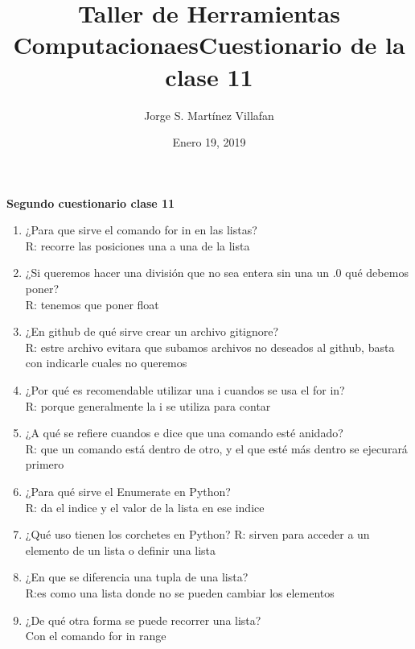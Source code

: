 \documentclass[letterpaper, 12pt, oneside]{article}%
\title{\Huge Taller de Herramientas Computacionaes}
\author{Jorge S. Martínez Villafan}
\date{Enero 19, 2019}
\begin{document}
\maketitle
\newpage
\title{Cuestionario de la clase 11}

\textbf{Segundo cuestionario clase 11}
\begin{enumerate}
\item ¿Para que sirve el comando for in en las listas?\\
\color{red} R: recorre las posiciones una a una de la lista
\item \color{black}¿Si queremos hacer una división que no sea entera sin una un .0 qué debemos poner?\\
\color{red} R: tenemos que poner float
\item \color{black} ¿En github de qué sirve crear un archivo gitignore?\\
\color{red} R: estre archivo evitara que subamos archivos no deseados al github, basta con indicarle cuales no queremos
\item \color{black} ¿Por qué es recomendable utilizar una i cuandos se usa el for in?\\
\color{red} R: porque generalmente la i se utiliza para contar
\item \color{black} ¿A qué se refiere cuandos e dice que una comando esté anidado?\\
\color{red} R: que un comando está dentro de otro, y el que esté más dentro se ejecurará primero
\item \color{black} ¿Para qué sirve el Enumerate en Python? \\
\color{red} R: da el indice y el valor de la lista en ese indice
\item \color{black} ¿Qué uso tienen los corchetes en Python?
\color{red} R: sirven para acceder a un elemento de un lista o definir una lista
\item \color{black} ¿En que se diferencia una tupla de una lista?\\
\color{red}R:es como una lista donde no se pueden cambiar los elementos
\item \color{black} ¿De qué otra forma se puede recorrer una lista?\\
\color{red} Con el comando for in range
\end{enumerate}
\end{document}
